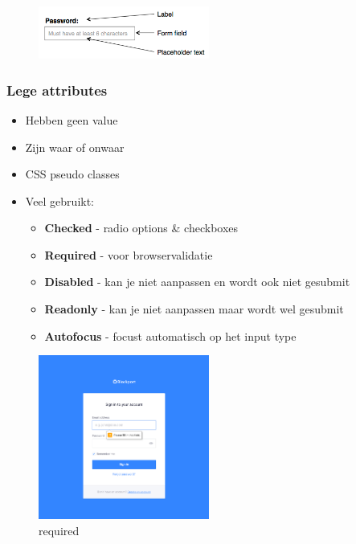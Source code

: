 \documentclass{article}
\newcommand{\bold}[1]{\textbf{#1}}
\begin{document}
\begin{figure}[H]
    \centering
    \includegraphics[width=0.5\textwidth]{veelgebruikte-attributes.png}
    \caption{}
\end{figure}

\subsubsection{Lege attributes}

\begin{itemize}
    \item Hebben geen value
    \item Zijn waar of onwaar
    \item CSS pseudo classes
    \item Veel gebruikt:
    \begin{itemize}
        \item \bold{Checked} - radio options \& checkboxes
        \item \bold{Required} - voor browservalidatie
        \item \bold{Disabled} - kan je niet aanpassen en wordt ook niet gesubmit
        \item \bold{Readonly} - kan je niet aanpassen maar wordt wel gesubmit
        \item \bold{Autofocus} - focust automatisch op het input type
    \end{itemize}
\end{itemize}

\begin{figure}[H]
    \centering
    \includegraphics[width=0.5\textwidth]{lege-attributes.png}
    \caption{required}
\end{figure}
\end{document}
